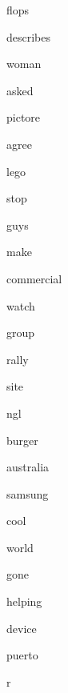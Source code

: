 \documentclass[varwidth]{standalone}
\begin{document}
\begin{CJK*}{UTF8}{gbsn}
{{{\colorbox{red!12.650283813476562}{\strut flops}
\colorbox{red!5.737027645111084}{\strut describes}
\colorbox{red!12.52188491821289}{\strut woman}
\colorbox{red!6.112111568450928}{\strut asked}
\colorbox{red!10.37406063079834}{\strut pictore}
\colorbox{red!7.4764204025268555}{\strut agree}
\colorbox{red!14.01919174194336}{\strut lego}
\colorbox{red!9.12547492980957}{\strut stop}
\colorbox{red!10.16931438446045}{\strut guys}
\colorbox{red!14.854257583618164}{\strut make}
\colorbox{red!6.504638671875}{\strut commercial}
\colorbox{red!11.263525009155273}{\strut watch}
\colorbox{red!6.797726154327393}{\strut group}
\colorbox{red!6.534122467041016}{\strut rally}
\colorbox{red!8.072103500366211}{\strut site}
\colorbox{red!17.60470962524414}{\strut ngl}
\colorbox{red!10.328163146972656}{\strut burger}
\colorbox{red!9.69792366027832}{\strut australia}
\colorbox{red!11.957160949707031}{\strut samsung}
\colorbox{red!9.787288665771484}{\strut cool}
\colorbox{red!7.494969367980957}{\strut world}
\colorbox{red!8.442296028137207}{\strut gone}
\colorbox{red!4.897519111633301}{\strut helping}
\colorbox{red!5.002236366271973}{\strut device}
\colorbox{red!13.84428882598877}{\strut puerto}
\colorbox{red!11.648015975952148}{\strut r}

}}}
\end{CJK*}
\end{document}
